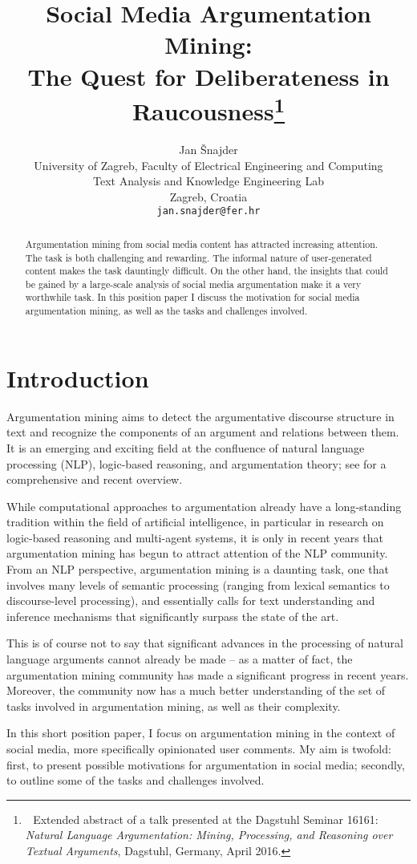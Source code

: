 \documentclass[11pt]{article}
\title{Social Media Argumentation Mining:\\The Quest for Deliberateness in Raucousness\thanks{\ \,Extended abstract of a talk presented at the Dagstuhl Seminar 16161: \emph{Natural Language Argumentation: Mining, Processing, and Reasoning over Textual Arguments}, Dagstuhl, Germany, April 2016.}}
\author{Jan Šnajder\\
  University of Zagreb, Faculty of Electrical Engineering and Computing \\
  Text Analysis and Knowledge Engineering Lab\\
  Zagreb, Croatia\\
  {\tt jan.snajder@fer.hr}}
\date{}
\begin{document}
\maketitle

\begin{abstract}
Argumentation mining from social media content has attracted increasing
attention. The task is both challenging and rewarding. The informal nature of
user-generated content makes the task dauntingly difficult. On the other hand,
the insights that could be gained by a large-scale analysis of social media
argumentation make it a very worthwhile task. In this position paper I discuss
the motivation for social media argumentation mining, as well as the tasks and
challenges involved.
\end{abstract}

\section{Introduction}

Argumentation mining aims to detect the argumentative discourse structure in
text and recognize the components of an argument and relations between them.
It is an emerging and exciting field at the confluence of natural language
processing (NLP), logic-based reasoning, and argumentation theory; see
\cite{moens2014argumentation,lippi2015argumentation} for a comprehensive and
recent overview.  

While computational approaches to argumentation already have a long-standing
tradition within the field of artificial intelligence, in particular in
research on logic-based reasoning and multi-agent systems, it is only in recent
years that argumentation mining has begun to attract attention of the NLP
community. From an NLP perspective, argumentation mining is a daunting task,
one that involves many levels of semantic processing (ranging from lexical
semantics to discourse-level processing), and essentially calls for text
understanding and inference mechanisms that significantly surpass the state of
the art.

This is of course not to say that significant advances in the processing of
natural language arguments cannot already be made -- as a matter of fact, the
argumentation mining community has made a significant progress in recent years.
Moreover, the community now has a much better understanding of the set of tasks
involved in argumentation mining, as well as their complexity.

In this short position paper, I focus on argumentation mining in the context of social
media, more specifically opinionated user comments. My aim is
twofold: first, to present possible motivations for argumentation in social
media; secondly, to outline some of the tasks and challenges involved.
\end{document}

